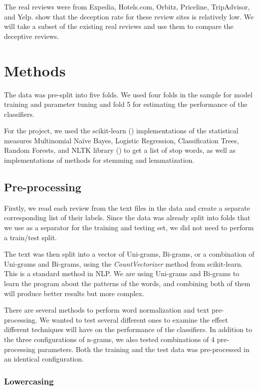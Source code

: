 \documentclass[a4paper, 11pt]{article}
\begin{document}
\begin{multicols}{2}
The real reviews were from Expedia, Hotels.com, Orbitz, Priceline, TripAdvisor, and Yelp. \cite{ott2011finding, ott2013negative} show that the deception rate for these review sites is relatively low. We will take a subset of the existing real reviews and use them to compare the deceptive reviews.

\section{Methods}

The data was pre-split into five folds. We used four folds in the sample for model training and parameter tuning and fold 5 for estimating the performance of the classifiers.

For the project, we used the scikit-learn (\cite{scikit-learn}) implementations of the statistical measures Multinomial Naïve Bayes, Logistic Regression, Classification Trees, Random Forests, and NLTK library (\cite{journals/corr/cs-CL-0205028, bird2009natural}) to get a list of stop words, as well as implementations of methods for stemming and lemmatization.

\subsection{Pre-processing}
Firstly, we read each review from the text files in the data and create a separate corresponding list of their labels. Since the data was already split into folds that we use as a separator for the training and testing set, we did not need to perform a train/test split. 

The text was then split into a vector of Uni-grams, Bi-grams, or a combination of Uni-grams and Bi-grams, using the \emph{CountVectorizer} method from scikit-learn. This is a standard method in NLP. We are using Uni-grams and Bi-grams to learn the program about the patterns of the words, and combining both of them will produce better results but more complex.

There are several methods to perform word normalization and text pre-processing. We wanted to test several different ones to examine the effect different techniques will have on the performance of the classifiers. In addition to the three configurations of n-grams, we also tested combinations of 4 pre-processing parameters. Both the training and the test data was pre-processed in an identical configuration.

\subsubsection{Lowercasing}


\end{multicols}
\end{document}
